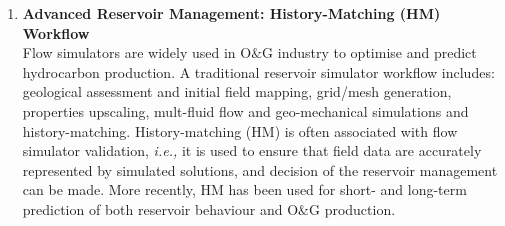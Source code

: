 \documentclass[12pts,a4paper,amsmath,amssymb,floatfix]{article}%
\newcommand{\all}{MSc O$\&$GE, PetE, UG Chem/Mech/Pet Engineering}
\newcommand{\ie}{{\it i.e., }}
\newcommand{\etall}{{\it et al. }}
\begin{document}
\begin{enumerate}[label=\bfseries Project: \arabic*:]
\noindent
{\bf Specifics:} 
\begin{enumerate}
\item Review and computational (\all) -- 1 student.
\end{enumerate}

\noindent
{\bf References:}
\begin{itemize}
\item Chen (2007) `Reservoir Simulation – Mathematical Techniques in Oil Recovery’, SIAM;
\item Ahmed $\&$ McKinney (2005) `Advanced Reservoir Engineering’, Elsevier;
\item Jenny \etall (2002) `Modeling Flow in Geometrically Complex Reservoirs Using Hexahedral Multiblock Grids’, SPE 78673;
\item DeBaun \etall (2006) `An Extensible Architecture for Next Generation Scalable Parallel Reservoir Simulation’, SPE 93274;
\item Chen \etall (2006) `Computational Methods for Multiphase Flows in PorousMedia', SIAM Computational Science $\&$ Engineering, ISBN 0-89871-606-3;
\item Teletzke \etall (2010) `Enhanced Oil Recovery Pilot Testing Best Practices', SPE Journal SPE118055;
\item Miller \etall (1998) `Multiphase Flow andTransport Modeling in Heterogeneous Porous Media: Challenges and Approaches', Advances in Water Resources 21:77-120.
\end{itemize}

\clearpage
\item {\bf Advanced Reservoir Management: History-Matching (HM) Workflow} \\
Flow simulators are widely used in O$\&$G industry to optimise and predict hydrocarbon production. A traditional reservoir simulator workflow includes: geological assessment and initial field mapping, grid/mesh generation, properties upscaling, mult-fluid flow and geo-mechanical simulations and history-matching. History-matching (HM) is often associated with flow simulator validation, \ie it is used to ensure that field data are accurately represented by simulated solutions, and decision of the reservoir management can be made. More recently, HM has been used for short- and long-term prediction of both reservoir behaviour and O$\&$G production.
      

\end{enumerate}
\end{document}
